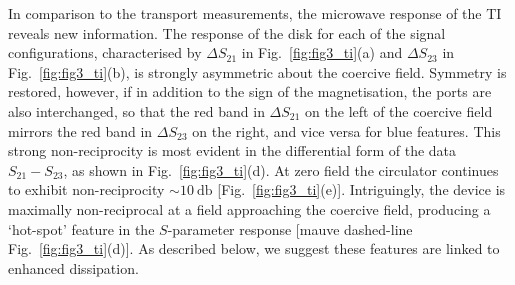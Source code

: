In comparison to the transport measurements, the microwave response of the TI reveals new information. The response of the disk for each of the signal configurations, characterised by $\Delta S_{21}$ in Fig.~\ref{fig:fig3_ti}(a) and $\Delta S_{23}$ in Fig.~\ref{fig:fig3_ti}(b), is strongly asymmetric about the coercive field. Symmetry is restored, however, if in addition to the sign of the magnetisation, the ports are also interchanged, so that the red band in $\Delta S_{21}$ on the left of the coercive field mirrors the red band in $\Delta S_{23}$ on the right, and vice versa for blue features. This strong non-reciprocity is most evident in the differential form of the data $S_{21} -  S_{23}$, as shown in Fig.~\ref{fig:fig3_ti}(d). At zero field the circulator continues to exhibit non-reciprocity $\sim \SI{10}{\decibel}$ [Fig.~\ref{fig:fig3_ti}(e)]. Intriguingly, the device is maximally non-reciprocal at a field approaching the coercive field, producing a `hot-spot' feature in the $S$-parameter response [mauve dashed-line Fig.~\ref{fig:fig3_ti}(d)]. As described below, we suggest these features are linked to enhanced dissipation.

